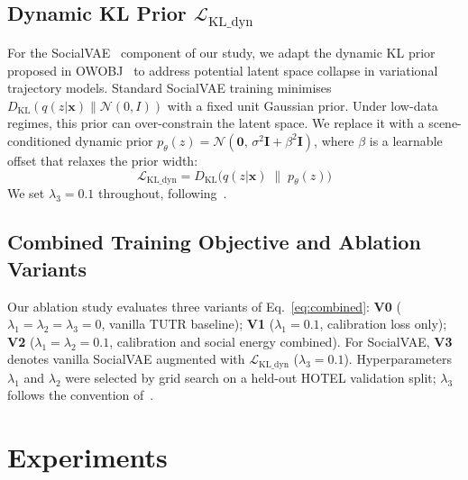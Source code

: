 \subsection{Dynamic KL Prior \(\mathcal{L}_{\text{KL\_dyn}}\)}
\label{sec:method:kl}

For the SocialVAE~\cite{xu2022socialvae} component of our study, we adapt the
dynamic KL prior proposed in OWOBJ~\cite{zhang2025openworld} to address
potential latent space collapse in variational trajectory models. Standard
SocialVAE training minimises
\(D_{\text{KL}}(q(z|\mathbf{x}) \| \mathcal{N}(0,I))\) with a fixed unit
Gaussian prior. Under low-data regimes, this prior can over-constrain the
latent space. We replace it with a scene-conditioned dynamic prior
\(p_\theta(z) = \mathcal{N}(\mathbf{0},\, \sigma^2 \mathbf{I} + \beta^2 \mathbf{I})\),
where \(\beta\) is a learnable offset that relaxes the prior width:
%
\begin{equation}
  \mathcal{L}_{\text{KL\_dyn}} = D_{\text{KL}}\!\bigl(
    q(z|\mathbf{x}) \;\|\; p_\theta(z)\bigr)
  \label{eq:lkl}
\end{equation}
%
We set \(\lambda_3 = 0.1\) throughout, following~\cite{zhang2025openworld}.

\subsection{Combined Training Objective and Ablation Variants}
\label{sec:method:combined}

Our ablation study evaluates three variants of Eq.~\eqref{eq:combined}:
\textbf{V0} (\(\lambda_1 = \lambda_2 = \lambda_3 = 0\), vanilla TUTR
baseline);
\textbf{V1} (\(\lambda_1 = 0.1\), calibration loss only);
\textbf{V2} (\(\lambda_1 = \lambda_2 = 0.1\), calibration and social energy
combined).
For SocialVAE, \textbf{V3} denotes vanilla SocialVAE augmented with
\(\mathcal{L}_{\text{KL\_dyn}}\) (\(\lambda_3 = 0.1\)).
Hyperparameters \(\lambda_1\) and \(\lambda_2\) were selected by grid search
on a held-out HOTEL validation split; \(\lambda_3\) follows the convention
of~\cite{zhang2025openworld}.



\section{Experiments}
\label{sec:experiments}

